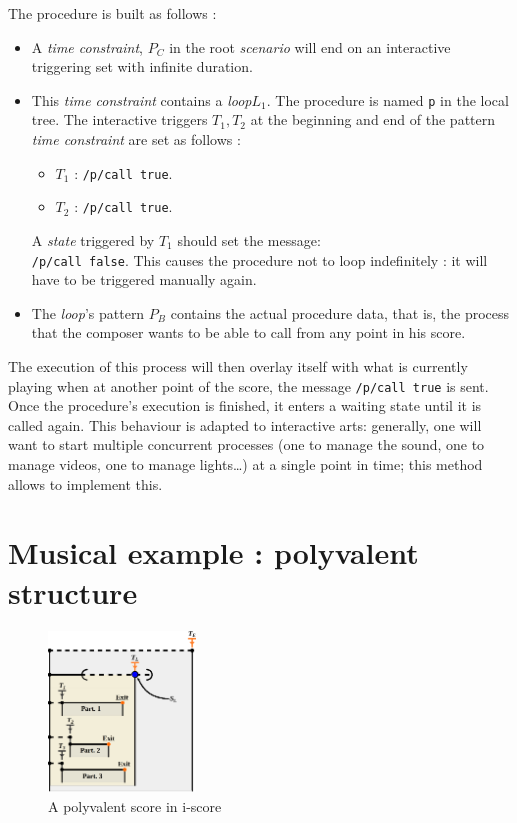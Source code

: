 \documentclass{article}
\newcommand{\scenario}{\textit{scenario}\xspace}
\newcommand{\Loop}{\textit{loop}\xspace}
\newcommand{\state}{\textit{state}\xspace}
\newcommand{\timeconstraint}{\textit{time constraint}\xspace}
\begin{document}
The procedure is built as follows : 
\begin{itemize}
    \item A \timeconstraint, $P_C$ in the root \scenario will end on an interactive triggering set with infinite duration.
    \item This \timeconstraint contains a \Loop $L_1$. 
    The procedure is named \lstinline{p} in the local tree. 
    The interactive triggers $T_1, T_2$ at the beginning and end of the pattern \timeconstraint are set as follows : 
    \begin{itemize}
        \item $T_1$ : \lstinline{/p/call true}.
        \item $T_2$ : \lstinline{/p/call true}.
    \end{itemize}
    A \state triggered by $T_1$ should set the message:~\\
    \lstinline{/p/call false}. 
    This causes the procedure not to loop 
    indefinitely : it will have to be triggered manually again.
    \item The \Loop's pattern $P_B$ contains the actual procedure data, that is, the process that the composer wants to be able to call from any point in his score. 
\end{itemize}

The execution of this process will then overlay itself with what is currently playing when at another point of the score, 
the message \lstinline{/p/call true} is sent.
Once the procedure's execution is finished, it enters a waiting state until it is called again.
This behaviour is adapted to interactive arts: generally, one will want to start multiple 
concurrent processes (one to manage the sound, one to manage videos, one to manage lights\dots) at a single point in time; this method allows to implement this.

\section{Musical example : polyvalent structure}
\begin{figure}[h]
    \centering
    \includegraphics[width=0.35\textwidth]{images/partition.eps}
    \caption{A polyvalent score in i-score}
    \label{fig.polyvalent}
\end{figure}
\end{document}
